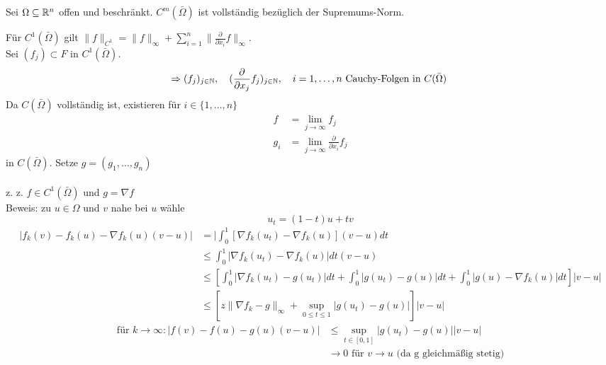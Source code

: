 \begin{beispiel}
	Sei $\Omega \subseteq \mathbb{R}^{n}$ offen und beschränkt. $C^{m}(\bar \Omega)$ ist vollständig bezüglich der Supremums-Norm.	
	\begin{beweis}
		Für $C^{1}(\bar \Omega)$ gilt $\| f \|_{C^{1}} = \| f \|_{\infty} + \sum_{i = 1}^{n}  \| \frac{\partial}{\partial x_{i}} f \|_{\infty}$. \\
		 Sei $(f_{j}) \subset F$ in $C^{1}(\bar \Omega)$.
		 \[ \Rightarrow (f_{j})_{j \in \MdN}, \quad (\frac{\partial}{\partial x_{j}} f_{j})_{j \in \MdN}, \quad i = 1, \dotsc, n \text{ Cauchy-Folgen in } C(\bar \Omega) \]
		 Da $C(\bar \Omega)$ vollständig ist, existieren für $i \in \{ 1, \dotsc, n \} $
		 	\begin{align*}
		 		f & = \lim_{j \rightarrow \infty} f_{j} \\
		 		g_{i} & = \lim_{j \rightarrow \infty} \frac{\partial}{\partial x_{i}} f_{j}
		 	\end{align*}
		 in $C(\bar \Omega)$. Setze $g = (g_{1}, \dotsc, g_{n})$ \\ \\
		 z. z. $f \in C^{1}(\bar \Omega)$ und $g = \nabla f$ \\
		 Beweis: zu $u \in \Omega$ und $v$ nahe bei $u$ wähle
		 \[ u_{t} = (1 - t) u + t v \]
		 \begin{align*}
		 	| f_{k}(v) - f_{k} (u) - \nabla f_{k}(u) (v - u) | & = | \int_{0}^{1} [ \nabla f_{k} (u_{t}) - \nabla f_{k} (u) ] (v - u) dt \\
		 		& \leq  \int_{0}^{1} | \nabla f_{k} (u_{t}) - \nabla f_{k} (u) | dt (v - u) \\
		 		& \leq \left[ \int_{0}^{1} | \nabla f_{k}(u_{t}) - g(u_{t}) | dt + \int_{0}^{1} | g(u_{t}) - g(u) | dt + \int_{0}^{1} | g(u) - \nabla f_{k}(u) | dt \right] |v - u| \\
		 		& \leq \left[ z \| \nabla f_{k} - g \|_{\infty} + \sup_{0 \leq t \leq 1} | g(u_{t}) - g(u) | \right] |v - u|
 		 \end{align*}
 		 \begin{align*}
 		 	\text{für } k \rightarrow \infty: | f(v) - f(u) - g(u)(v - u) | & \leq \sup_{t \in [0, 1]} | g(u_{t}) - g(u) | |v - u| \\
 		 		& \rightarrow 0 \text{ für } v \rightarrow u \text{ (da g gleichmä{\ss}ig stetig)}
 		 \end{align*} 
	\end{beweis}
\end{beispiel}

